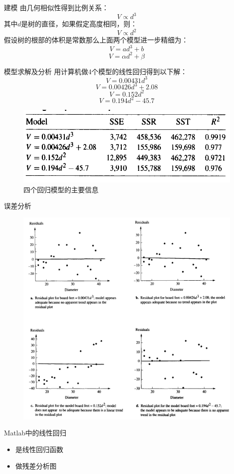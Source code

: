 \documentclass[mathserif, table]{beamer}
\begin{document}
\begin{frame}{建模}
    由几何相似性得到比例关系： 
    \[
    V \propto d^3
    \]
    其中$d$是树的直径，如果假定高度相同，则：
    \[
    V \propto d^2
    \]
    假设树的根部的体积是常数那么上面两个模型进一步精细为：
    \[
    V = ad^3+b
    \]
    \[
    V = \alpha d^2 + \beta
    \]
\end{frame}

\begin{frame}{模型求解及分析}
  用计算机做4个模型的线性回归得到以下解：
    \[
    V = 0.00431d^3
    \]
    \[
    V = 0.00426d^3 + 2.08
    \]
    \[
    V = 0.152d^2
    \]
    \[
    V = 0.194d^2 - 45.7
    \]

    \begin{figure}
      \centering
      \includegraphics[width=.6\textwidth{}]{pine-regress.png}
      \caption{四个回归模型的主要信息}
    \end{figure}
  
\end{frame}

\begin{frame}{误差分析}

  \begin{figure}
    \centering
    \includegraphics[height=.7\textheight{}]{pine-error.png}
  \end{figure}
  
\end{frame}

\begin{frame}{Matlab中的线性回归}
  \begin{itemize}
  \item {}是线性回归函数
  \item {}做残差分析图
  \end{itemize}
\end{frame}
\end{document}
